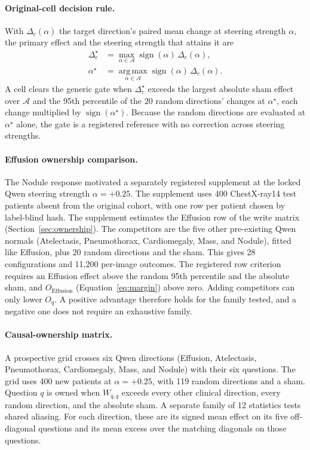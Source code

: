 \paragraph{Original-cell decision rule.}
With $\Delta_c(\alpha)$ the target direction's paired mean change at steering strength $\alpha$, the primary effect and the steering strength that attains it are
\begin{equation}
\begin{aligned}
\Delta^\star_c&=\max_{\alpha\in\mathcal A}\operatorname{sign}(\alpha)\,\Delta_c(\alpha),\\
\alpha^\star&=\operatorname*{arg\,max}_{\alpha\in\mathcal A}\operatorname{sign}(\alpha)\,\Delta_c(\alpha).
\end{aligned}
\label{eq:seed-rule}
\end{equation}
A cell clears the generic gate when $\Delta^\star_c$ exceeds the largest absolute sham effect over $\mathcal A$ and the 95th percentile of the 20 random directions' changes at $\alpha^\star$, each change multiplied by $\operatorname{sign}(\alpha^\star)$. Because the random directions are evaluated at $\alpha^\star$ alone, the gate is a registered reference with no correction across steering strengths.

\paragraph{Effusion ownership comparison.}
The Nodule response motivated a separately registered supplement at the locked Qwen steering strength $\alpha=+0.25$. The supplement uses 400 ChestX-ray14 test patients absent from the original cohort, with one row per patient chosen by label-blind hash. The supplement estimates the Effusion row of the write matrix (Section~\ref{sec:ownership}). The competitors are the five other pre-existing Qwen normals (Atelectasis, Pneumothorax, Cardiomegaly, Mass, and Nodule), fitted like Effusion, plus 20 random directions and the sham. This gives 28 configurations and 11,200 per-image outcomes. The registered row criterion requires an Effusion effect above the random 95th percentile and the absolute sham, and $O_{\mathrm{Effusion}}$ (Equation~\ref{eq:margin}) above zero. Adding competitors can only lower $O_q$. A positive advantage therefore holds for the family tested, and a negative one does not require an exhaustive family.

\paragraph{Causal-ownership matrix.}
A prospective grid crosses six Qwen directions (Effusion, Atelectasis, Pneumothorax, Cardiomegaly, Mass, and Nodule) with their six questions. The grid uses 400 new patients at $\alpha=+0.25$, with 119 random directions and a sham. Question $q$ is owned when $W_{q,q}$ exceeds every other clinical direction, every random direction, and the absolute sham. A separate family of 12 statistics tests shared aliasing. For each direction, these are its signed mean effect on its five off-diagonal questions and its mean excess over the matching diagonals on those questions.

